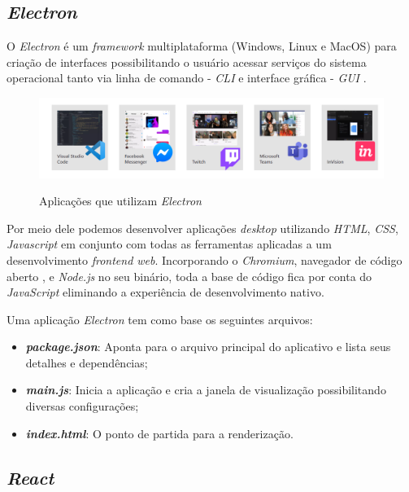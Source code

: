 \subsection{\textit{Electron}}

O \textit{Electron} é um \textit{framework} multiplataforma (Windows, Linux e MacOS) para criação de interfaces possibilitando o usuário acessar serviços do sistema operacional tanto via linha de comando - \textit{CLI} e interface gráfica - \textit{GUI} \cite{Electron}.

\begin{figure}[H]
	\centering
	\caption{Aplicações que utilizam \textit{Electron}}
	\includegraphics[width=1.0\textwidth]{figuras/electron_apps.png}
	\label{fig:electron_apps}
\end{figure} 

Por meio dele podemos desenvolver aplicações \textit{desktop} utilizando \textit{HTML}, \textit{CSS}, \textit{Javascript} em conjunto com todas as ferramentas aplicadas a um desenvolvimento \textit{frontend web}. Incorporando o \textit{Chromium}, navegador de código aberto \cite{Chromium}, e \textit{Node.js} no seu binário, toda a base de código fica por conta do \textit{JavaScript} eliminando a experiência de desenvolvimento nativo.

Uma aplicação \textit{Electron} tem como base os seguintes arquivos:

\begin{itemize}
	\item \textbf{\textit{package.json}}: Aponta para o arquivo principal do aplicativo e lista seus detalhes e dependências;
	\item \textbf{\textit{main.js}}: Inicia a aplicação e cria a janela de visualização possibilitando diversas configurações; 
	\item \textbf{\textit{index.html}}: O ponto de partida para a renderização.
\end{itemize}



\subsection{\textit{React}}

